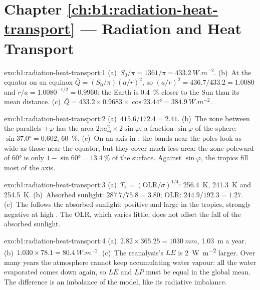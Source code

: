 \section*{Chapter \ref{ch:b1:radiation-heat-transport} --- Radiation and Heat Transport}

\begin{solution}{exo:b1:radiation-heat-transport:1}
(a)~$S_0/\pi = 1361/\pi = \qty{433.2}{W.m^{-2}}$. (b)~At the equator on an equinox
$\bar Q = (S_0/\pi)(a/r)^2$, so $(a/r)^2 = 436.7/433.2 = 1.0080$ and $r/a =
1.0080^{-1/2} = 0.9960$: the Earth is \qty{0.4}{\percent} closer to the Sun than
its mean distance. (c)~$\bar Q = 433.2 \times 0.9683 \times \cos\ang{23.44} =
\qty{384.9}{W.m^{-2}}$.
\end{solution}

\begin{solution}{exo:b1:radiation-heat-transport:2}
(a)~$415.6/172.4 = 2.41$. (b)~The zone between the parallels $\pm\varphi$ has the
area $2\pi a_\oplus^2 \times 2\sin\varphi$, a fraction $\sin\varphi$ of the sphere:
$\sin\ang{37.0} = 0.602$, \qty{60}{\percent}. (c)~On an axis in , the
bands near the poles look as wide as those near the equator, but they cover much
less area: the zone poleward of \ang{60} is only $1 - \sin\ang{60} =
\qty{13.4}{\percent}$ of the surface. Against $\sin\varphi$, the tropics fill most
of the axis.
\end{solution}

\begin{solution}{exo:b1:radiation-heat-transport:3}
(a)~$T_e = (\text{OLR}/\sigma)^{1/4}$: \qty{256.4}{K}, \qty{241.3}{K} and
\qty{254.5}{K}. (b)~Absorbed sunlight: $287.7/75.8 = 3.80$; OLR: $244.9/192.3 =
1.27$. (c)~The  follows the absorbed sunlight: positive and large in the
tropics, strongly negative at high . The OLR, which varies little, does
not offset the fall of the absorbed sunlight.
\end{solution}

\begin{solution}{exo:b1:radiation-heat-transport:4}
(a)~$2.82 \times 365.25 = \qty{1030}{mm}$, \qty{1.03}{m} a year. (b)~$1.030 \times
78.1 = \qty{80.4}{W.m^{-2}}$.
(c)~The reanalysis's $LE$ is \qty{2}{W.m^{-2}} larger. Over many years the
atmosphere cannot keep accumulating water vapour: all the water evaporated comes
down again, so $LE$ and $LP$ must be equal in the global mean. The difference is
an imbalance of the model, like its radiative imbalance.
\end{solution}

